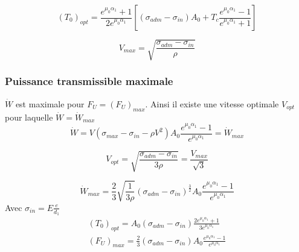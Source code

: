 \documentclass[../main.tex]{subfiles}
\begin{document}
\begin{equation}
    (T_0)_{opt} = \frac{e^{\mu_0 \alpha_1}+1}{2e^{\mu_0 \alpha_1}}[(\sigma_{adm}-\sigma_{in})A_0 + T_c \frac{e^{\mu_0 \alpha_1}-1}{e^{\mu_0 \alpha_1}+1}]
\end{equation}

\begin{equation}
    V_{max} = \sqrt{\frac{\sigma_{adm}-\sigma_{in}}{\rho}}
\end{equation}

\subsubsection{Puissance transmissible maximale}
$\dot{W}$ est maximale pour $F_U = (F_U)_{max}$. Ainsi il existe une vitesse optimale $V_{opt}$ pour laquelle $\dot{W} = \dot{W}_{max}$\\

\begin{equation}
    \dot{W} = V(\sigma_{max}-\sigma_{in} - \rho V^2) A_0 \frac{e^{\mu_0 \alpha_1}-1}{e^{\mu_0 \alpha_1}} = \dot{W}_{max}
\end{equation}

\begin{equation}
    V_{opt} = \sqrt{\frac{\sigma_{adm}-\sigma_{in}}{3\rho}} = \frac{V_{max}}{\sqrt{3}}
\end{equation}

\begin{equation}
    \dot{W}_{max} = \frac{2}{3} \sqrt{\frac{1}{3\rho}}(\sigma_{adm}-\sigma_{in})^{\frac{3}{2}} A_0 \frac{e^{\mu_0 \alpha_1}-1}{e^{\mu_0 \alpha_1}}
\end{equation}
Avec $\sigma_{in} = E \frac{e}{d_1}$\\

\begin{equation}
    \begin{gathered}
        (T_0)_{opt} = A_0 (\sigma_{adm}-\sigma_{in}) \frac{2e^{\mu_0 \alpha_1}+1}{3e^{\mu_0 \alpha_1}}\\
        (F_U)_{max} = \frac{2}{3} (\sigma_{adm}-\sigma_{in}) A_0 \frac{e^{\mu_0 \alpha_1}-1}{e^{\mu_0 \alpha_1}}\\
    \end{gathered}
\end{equation}
\end{document}
